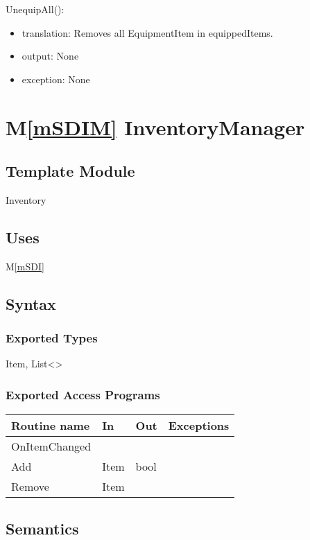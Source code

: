 \documentclass[12pt]{article}
\newcommand{\mref}[1]{M\ref{#1}}
\begin{document}
\noindent UnequipAll():
\begin{itemize}
\item translation: Removes all EquipmentItem in equippedItems.
\item output: None
\item exception: None
\end{itemize}

\newpage

\section* {\mref{mSDIM} InventoryManager}

\subsection*{Template Module}

Inventory

\subsection* {Uses}

\mref{mSDI}

\subsection* {Syntax}

\subsubsection* {Exported Types}

Item, List<>

\subsubsection* {Exported Access Programs}

\begin{tabular}{| l | l | l | l |}
\hline
\textbf{Routine name} & \textbf{In} & \textbf{Out} & \textbf{Exceptions}\\
\hline
OnItemChanged & ~ & ~  & ~\\
Add & Item & bool & ~\\
Remove & Item & ~  & ~\\
\hline
\end{tabular}

\subsection* {Semantics}
\end{document}
